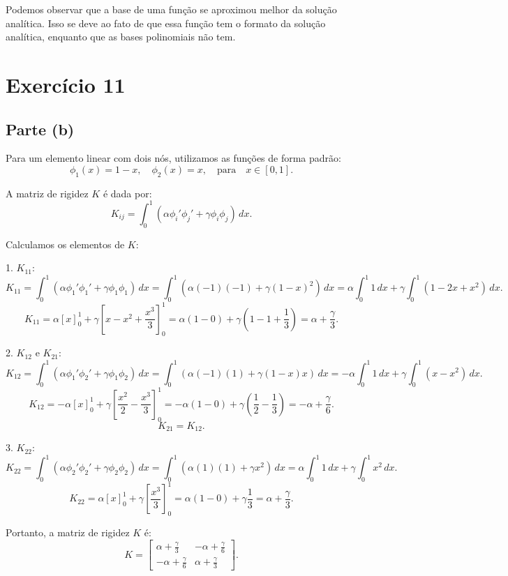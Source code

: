 \documentclass{article}
\begin{document}
Podemos observar que a base de uma função se aproximou melhor da solução analítica. Isso se deve ao fato de que essa função tem o formato da solução analítica, enquanto que as bases polinomiais não tem.

\section{Exercício 11}

\subsection{Parte (b)}

Para um elemento linear com dois nós, utilizamos as funções de forma padrão:
\[
\phi_1(x) = 1 - x, \quad \phi_2(x) = x, \quad \text{para} \quad x \in [0, 1].
\]

A matriz de rigidez \( K \) é dada por:
\[
K_{ij} = \int_0^1 (\alpha \phi_i' \phi_j' + \gamma \phi_i \phi_j) \, dx.
\]

Calculamos os elementos de \( K \):

1. \( K_{11} \):
\[
K_{11} = \int_0^1 (\alpha \phi_1' \phi_1' + \gamma \phi_1 \phi_1) \, dx = \int_0^1 (\alpha (-1)(-1) + \gamma (1-x)^2) \, dx = \alpha \int_0^1 1 \, dx + \gamma \int_0^1 (1 - 2x + x^2) \, dx.
\]
\[
K_{11} = \alpha \left[ x \right]_0^1 + \gamma \left[ x - x^2 + \frac{x^3}{3} \right]_0^1 = \alpha (1 - 0) + \gamma \left(1 - 1 + \frac{1}{3}\right) = \alpha + \frac{\gamma}{3}.
\]

2. \( K_{12} \) e \( K_{21} \):
\[
K_{12} = \int_0^1 (\alpha \phi_1' \phi_2' + \gamma \phi_1 \phi_2) \, dx = \int_0^1 (\alpha (-1)(1) + \gamma (1-x)x) \, dx = -\alpha \int_0^1 1 \, dx + \gamma \int_0^1 (x - x^2) \, dx.
\]
\[
K_{12} = -\alpha \left[ x \right]_0^1 + \gamma \left[ \frac{x^2}{2} - \frac{x^3}{3} \right]_0^1 = -\alpha (1 - 0) + \gamma \left(\frac{1}{2} - \frac{1}{3}\right) = -\alpha + \frac{\gamma}{6}.
\]
\[
K_{21} = K_{12}.
\]

3. \( K_{22} \):
\[
K_{22} = \int_0^1 (\alpha \phi_2' \phi_2' + \gamma \phi_2 \phi_2) \, dx = \int_0^1 (\alpha (1)(1) + \gamma x^2) \, dx = \alpha \int_0^1 1 \, dx + \gamma \int_0^1 x^2 \, dx.
\]
\[
K_{22} = \alpha \left[ x \right]_0^1 + \gamma \left[ \frac{x^3}{3} \right]_0^1 = \alpha (1 - 0) + \gamma \frac{1}{3} = \alpha + \frac{\gamma}{3}.
\]

Portanto, a matriz de rigidez \( K \) é:
\[
K = \begin{bmatrix}
\alpha + \frac{\gamma}{3} & -\alpha + \frac{\gamma}{6} \\
-\alpha + \frac{\gamma}{6} & \alpha + \frac{\gamma}{3}
\end{bmatrix}.
\]
\end{document}
